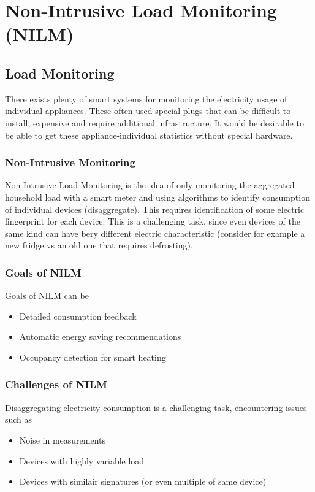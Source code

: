 \section{Non-Intrusive Load Monitoring (NILM)}

\subsection{Load Monitoring}
There exists plenty of smart systems for monitoring the electricity usage of individual appliances.
These often used special plugs that can be difficult to install, expensive and require additional infrastructure.
It would be desirable to be able to get these appliance-individual statistics without special hardware.

\subsubsection{Non-Intrusive Monitoring}
Non-Intrusive Load Monitoring is the idea of only monitoring the aggregated household load with a smart meter and using algorithms to identify consumption of individual devices (disaggregate).
This requires identification of some electric fingerprint for each device.
This is a challenging task, since even devices of the same kind can have bery different electric characteristic (consider for example a new fridge vs an old one that requires defrosting).

\subsubsection{Goals of NILM}
Goals of NILM can be
\begin{itemize}
    \item Detailed consumption feedback
    \item Automatic energy saving recommendations
    \item Occupancy detection for smart heating
\end{itemize}

\subsubsection{Challenges of NILM}
Disaggregating electricity consumption is a challenging task, encountering issues such as

\begin{itemize}
    \item Noise in measurements
    \item Devices with highly variable load
    \item Devices with similair signatures (or even multiple of same device)
\end{itemize}

